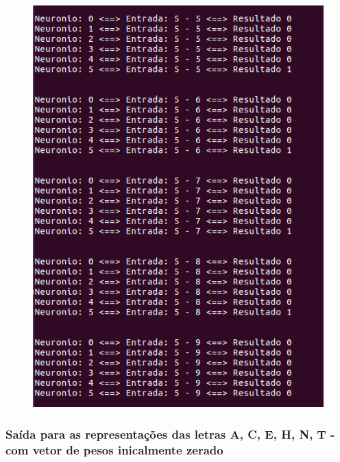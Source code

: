\documentclass[hidelinks,12pt]{article}
\begin{document}
		\begin{figure}[!h]
			\centering
			\includegraphics[scale=0.5]{Figures/E3S5P2.png}
		\end{figure}
		
		\newpage
		
		\subsubsection{Saída para as representações das letras A, C, E, H, N, T - com vetor de pesos inicalmente zerado}
		
\end{document}
